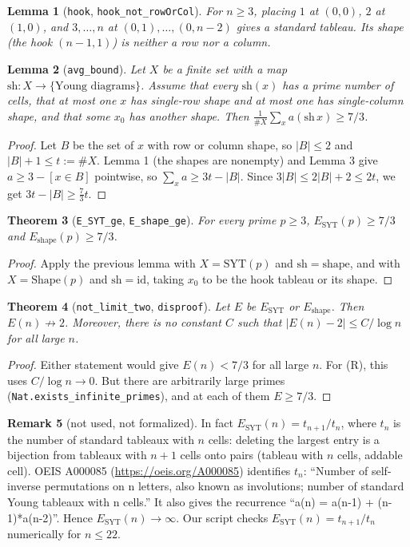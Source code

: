 \documentclass[11pt]{article}
\newtheorem{theorem}{Theorem}
\newtheorem{lemma}[theorem]{Lemma}
\theoremstyle{definition}
\newtheorem{remark}[theorem]{Remark}
\begin{document}
\begin{lemma}[\texttt{hook}, \texttt{hook\_not\_rowOrCol}]
For $n\ge3$, placing $1$ at $(0,0)$, $2$ at $(1,0)$, and $3,\dots,n$ at $(0,1),\dots,(0,n-2)$ gives a
standard tableau. Its shape (the hook $(n-1,1)$) is neither a row nor a column.
\end{lemma}

\begin{lemma}[\texttt{avg\_bound}]
Let $X$ be a finite set with a map $\mathrm{sh}:X\to\{\text{Young diagrams}\}$. Assume that every
$\mathrm{sh}(x)$ has a prime number of cells, that at most one $x$ has single-row shape and at most one
has single-column shape, and that some $x_0$ has another shape. Then
$\frac{1}{\#X}\sum_{x}a(\mathrm{sh}\,x)\ge 7/3$.
\end{lemma}
\begin{proof}
Let $B$ be the set of $x$ with row or column shape, so $|B|\le2$ and $|B|+1\le t:=\#X$. Lemma 1
(the shapes are nonempty) and Lemma 3 give $a\ge 3-[x\in B]$ pointwise, so $\sum_x a\ge 3t-|B|$. Since
$3|B|\le 2|B|+2\le 2t$, we get $3t-|B|\ge \tfrac73 t$.
\end{proof}

\begin{theorem}[\texttt{E\_SYT\_ge}, \texttt{E\_shape\_ge}]
For every prime $p\ge3$, $E_{\mathrm{SYT}}(p)\ge 7/3$ and $E_{\mathrm{shape}}(p)\ge7/3$.
\end{theorem}
\begin{proof}
Apply the previous lemma with $X=\mathrm{SYT}(p)$ and $\mathrm{sh}=\mathrm{shape}$, and with
$X=\mathrm{Shape}(p)$ and $\mathrm{sh}=\mathrm{id}$, taking $x_0$ to be the hook tableau or its shape.
\end{proof}

\begin{theorem}[\texttt{not\_limit\_two}, \texttt{disproof}]
Let $E$ be $E_{\mathrm{SYT}}$ or $E_{\mathrm{shape}}$. Then $E(n)\not\to2$. Moreover, there is no
constant $C$ such that $|E(n)-2|\le C/\log n$ for all large $n$.
\end{theorem}
\begin{proof}
Either statement would give $E(n)<7/3$ for all large $n$. For (R), this uses $C/\log n\to0$. But
there are arbitrarily large primes (\texttt{Nat.exists\_infinite\_primes}), and at each of them
$E\ge 7/3$.
\end{proof}

\begin{remark}[not used, not formalized]
In fact $E_{\mathrm{SYT}}(n)=t_{n+1}/t_n$, where $t_n$ is the number of standard tableaux with $n$
cells: deleting the largest entry is a bijection from tableaux with $n+1$ cells onto pairs (tableau
with $n$ cells, addable cell). OEIS A000085 (\url{https://oeis.org/A000085}) identifies $t_n$:
``Number of self-inverse permutations on n letters, also known as involutions; number of standard
Young tableaux with n cells.'' It also gives the recurrence ``a(n) = a(n-1) + (n-1)*a(n-2)''. Hence
$E_{\mathrm{SYT}}(n)\to\infty$. Our script checks $E_{\mathrm{SYT}}(n)=t_{n+1}/t_n$ numerically for
$n\le22$.
\end{remark}
\end{document}
